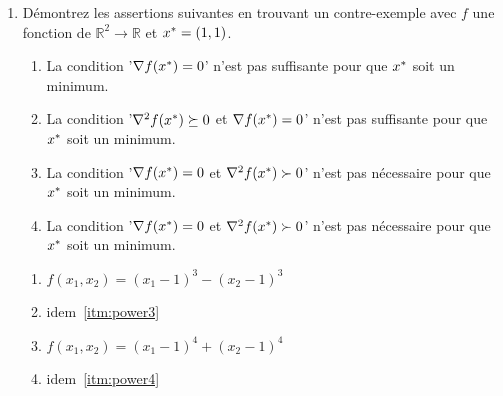 \begin{enumerate}
  \item Démontrez les assertions suivantes en trouvant un contre-exemple
  avec $f$ une fonction de $\mathbb{R}^2 \rightarrow \mathbb{R}$
  et $x^* = (1,1)$.
  \begin{enumerate}
    \item La condition '$\nabla f(x^*)=0$' 
    n'est pas suffisante pour que $x^*$ soit un minimum.
    \item La condition '$\nabla^2 f(x^*)\succeq 0$ et $\nabla f(x^*)=0$'
    n'est pas suffisante pour que $x^*$ soit un minimum.
    \item La condition '$\nabla f(x^*) = 0$ et $\nabla^2 f(x^*)\succ 0$' 
    n'est pas nécessaire pour que $x^*$ soit un minimum.  
    \item La condition '$\nabla f(x^*)=0$ et $\nabla^2 f(x^*) \succ 0$' 
    n'est pas nécessaire pour que $x^*$ soit un minimum.
  \end{enumerate}
  
    \begin{solution}
      \begin{enumerate}
        \item $f(x_1,x_2) = (x_1 - 1)^3 - (x_2 - 1)^3$ \label{itm:power3}
        \item idem~\ref{itm:power3}
        \item $f(x_1,x_2) = (x_1 - 1)^4 + (x_2 - 1)^4$ \label{itm:power4}
        \item idem~\ref{itm:power4}
      \end{enumerate}
    \end{solution}
  
\end{enumerate}

